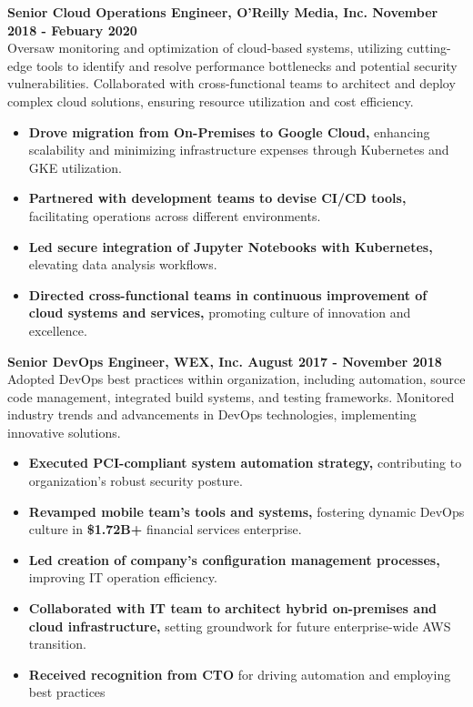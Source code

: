 \documentclass[10pt]{article}
\begin{document}
\normalsize
\noindent\textbf{Senior Cloud Operations Engineer, O'Reilly Media, Inc. \hfill{November 2018 - Febuary 2020}}\\
\normalsize Oversaw monitoring and optimization of cloud-based systems, utilizing cutting-edge tools to identify and resolve 
performance bottlenecks and potential security vulnerabilities. Collaborated with cross-functional teams to architect and deploy complex 
cloud solutions, ensuring resource utilization and cost efficiency.
\begin{itemize}
\small
\item \textbf{Drove migration from On-Premises to Google Cloud,} enhancing scalability and minimizing infrastructure expenses through Kubernetes and GKE utilization.
\item \textbf{Partnered with development teams to devise CI/CD tools,} facilitating operations across different environments.
\item \textbf{Led secure integration of Jupyter Notebooks with Kubernetes,} elevating data analysis workflows.
\item \textbf{Directed cross-functional teams in continuous improvement of cloud systems and services,} promoting culture of
innovation and excellence.
\end{itemize}

\normalsize
\noindent\textbf{Senior DevOps Engineer, WEX, Inc. \hfill{August 2017 - November 2018}}\\
\normalsize Adopted DevOps best practices within organization, including automation, source code management, integrated build systems, 
and testing frameworks. Monitored industry trends and advancements in DevOps technologies, implementing innovative solutions.
\begin{itemize}
\small
\item \textbf{Executed PCI-compliant system automation strategy,} contributing to organization's robust security posture.
\item \textbf{Revamped mobile team's tools and systems,} fostering dynamic DevOps culture in \textbf{\$1.72B+} financial services enterprise.
\item \textbf{Led creation of company's configuration management processes,} improving IT operation efficiency.
\item \textbf{Collaborated with IT team to architect hybrid on-premises and cloud infrastructure,} setting groundwork for future
enterprise-wide AWS transition.
\item \textbf{Received recognition from CTO} for driving automation and employing best practices
\end{itemize}
\end{document}
